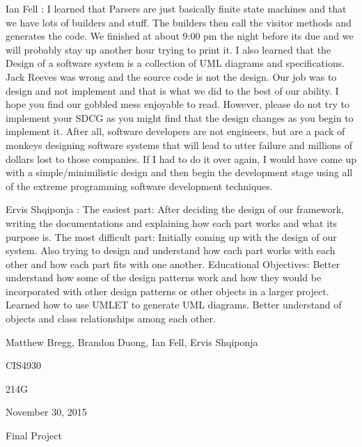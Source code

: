 \documentclass{article}
\begin{document}
\begin{list}{Learning Experience, }{}
\item Ian Fell : I learned that Parsers are just basically finite state machines and that we have lots of builders and stuff. The builders then call the visitor methods and generates the code. We finished at about 9:00 pm the night before its due and we will probably stay up another hour trying to print it. I also learned that the Design of a software system is a collection of UML diagrams and specifications. Jack Reeves was wrong and the source code is not the design. Our job was to design and not implement and that is what we did to the best of our ability. I hope you find our gobbled mess enjoyable to read. However, please do not try to implement your SDCG as you might find that the design changes as you begin to implement it. After all, software developers are not engineers, but are a pack of monkeys designing software systems that will lead to utter failure and millions of dollars lost to those companies. If I had to do it over again, I would have come up with a simple/minimilistic design and then begin the development stage using all of the extreme programming software development techniques.
\item Ervis Shqiponja : The easiest part: After deciding the design of our framework, writing the documentations and explaining how each part works and what its purpose is.
The most difficult part: Initially coming up with the design of our system. Also trying to design and understand how each part works with each other and how each part fits with one another.
Educational Objectives: Better understand how some of the design patterns work and how they would be incorporated with other design patterns or other objects in a larger project. Learned how to use UMLET to generate UML diagrams. Better understand of objects and class relationships among each other.

\end{list}
\newpage

\begin{flushright}
Matthew Bregg, Brandon Duong,  Ian Fell, Ervis Shqiponja
\end{flushright}
\begin{flushright}
CIS4930
\end{flushright}
\begin{flushright}
214G
\end{flushright}
\begin{flushright}
November 30, 2015
\end{flushright}
\begin{flushright}
Final Project
\end{flushright}
\end{document}
